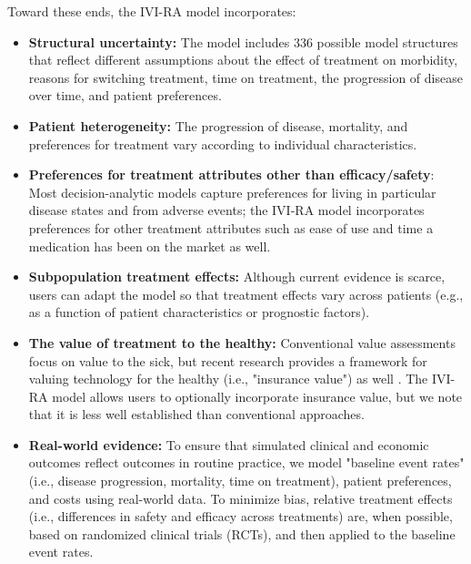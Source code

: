 \documentclass[11pt,final,fleqn]{article}\usepackage[]{graphicx}\usepackage[]{color}
\theoremstyle{plain}
\begin{document}
Toward these ends, the IVI-RA model incorporates:

\begin{itemize}
\item \textbf{Structural uncertainty:} The model includes 336 possible model structures that reflect different assumptions about the effect of treatment on morbidity, reasons for switching treatment, time on treatment, the progression of disease over time, and patient preferences. 
\item \textbf{Patient heterogeneity:} The progression of disease, mortality, and preferences for treatment vary according to individual characteristics.
\item \textbf{Preferences for treatment attributes other than efficacy/safety}: Most decision-analytic models capture preferences for living in particular disease states and from adverse events; the IVI-RA model incorporates preferences for other treatment attributes such as ease of use and time a medication has been on the market as well. 
\item \textbf{Subpopulation treatment effects:} Although current evidence is scarce, users can adapt the model so that treatment effects vary across patients (e.g., as a function of patient characteristics or prognostic factors). 
\item \textbf{The value of treatment to the healthy:} Conventional value assessments focus on value to the sick, but recent research provides a framework for valuing technology for the healthy (i.e., "insurance value") as well \citet{lakdawalla2017insurance}. The IVI-RA model allows users to optionally incorporate insurance value, but we note that it is less well established than conventional approaches.  
\item \textbf{Real-world evidence:} To ensure that simulated clinical and economic outcomes reflect outcomes in routine practice, we model "baseline event rates" (i.e., disease progression, mortality, time on treatment), patient preferences, and costs using real-world data. To minimize bias, relative treatment effects (i.e., differences in safety and efficacy across treatments) are, when possible, based on randomized clinical trials (RCTs), and then applied to the baseline event rates.
\end{itemize}
\end{document}
